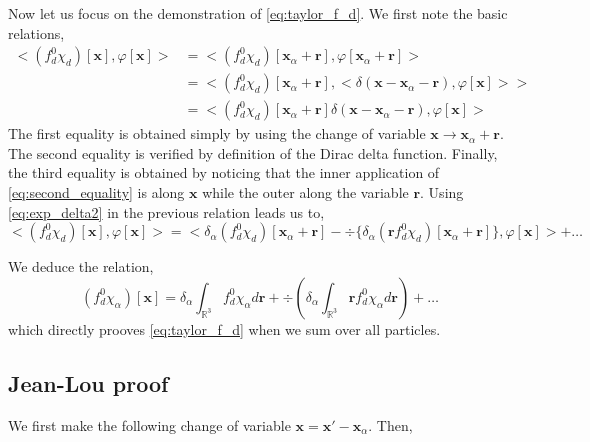 Now let us focus on the demonstration of \ref{eq:taylor_f_d}. 
We first note the basic relations, 
\begin{align}
    <(f_d^0\chi_d)[\textbf{x}],\varphi[\textbf{x}]>
    &= <(f_d^0\chi_d)[\textbf{x}_\alpha+\textbf{r}],\varphi[\textbf{x}_\alpha+\textbf{r}]>\\
    &= 
    <(f_d^0\chi_d)[\textbf{x}_\alpha + \textbf{r}] ,<\delta(\textbf{x} - \textbf{x}_\alpha - \textbf{r}), \varphi[\textbf{x}]>>
    \label{eq:second_equality}
    \\
    &= 
    <(f_d^0\chi_d)[\textbf{x}_\alpha + \textbf{r}] \delta(\textbf{x} - \textbf{x}_\alpha - \textbf{r}), \varphi[\textbf{x}]>
\end{align}
The first equality is obtained simply by using the change of variable $\textbf{x} \to \textbf{x}_\alpha + \textbf{r}$. 
The second equality is verified by definition of the Dirac delta function. 
Finally, the third equality is obtained by noticing that the inner application of \ref{eq:second_equality} is along $\textbf{x}$ while the outer along the variable $\textbf{r}$. 
Using \ref{eq:exp_delta2} in the previous relation leads us to, 
\begin{equation}
    <(f_d^0\chi_d)[\textbf{x}],\varphi[\textbf{x}]>
    = 
    <\delta_\alpha (f_d^0\chi_d)[\textbf{x}_\alpha + \textbf{r}]  - \div\{\delta_\alpha (\textbf{r} f_d^0\chi_d)[\textbf{x}_\alpha + \textbf{r}] \}, \varphi[\textbf{x}]>
    + \ldots
\end{equation}

We deduce the relation,
\begin{equation}
    (f^0_d \chi_\alpha)[\textbf{x}]
    = 
    \delta_\alpha
    \int_{\mathbb{R}^3}
        f^0_d\chi_\alpha
    d\textbf{r}
    + \div\left(    
    \delta_\alpha
    \int_{\mathbb{R}^3}
    \textbf{r}
    f^0_d\chi_\alpha
    d\textbf{r}
    \right)
    + \ldots
\end{equation}
which directly prooves \ref{eq:taylor_f_d} when we sum over all particles. 


\subsection{Jean-Lou proof}
We first make the following change of variable $\textbf{x} = \textbf{x} ' - \textbf{x}_\alpha$. Then,  

